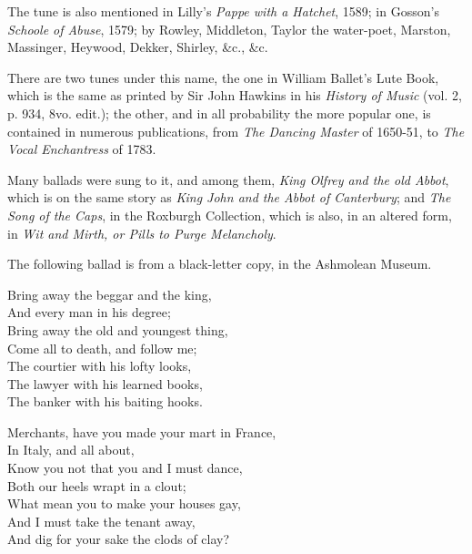 The tune is also mentioned in Lilly’s \textit{Pappe with a Hatchet}, 1589; in Gosson’s
\textit{Schoole of Abuse}, 1579; by Rowley, Middleton, Taylor the water-poet, Marston,
Massinger, Heywood, Dekker, Shirley, \&c., \&c.

There are two tunes under this name, the one in William Ballet’s Lute Book,
which is the same as printed by Sir John Hawkins in his \textit{History of Music}
(vol. 2, p. 934, 8vo. edit.); the other, and in all probability the more popular one,
is contained in numerous publications, from \textit{The Dancing Master} of 1650-51, to
\textit{The Vocal Enchantress} of 1783.
\normalsize

\pagebreak
Many ballads were sung to it, and among them, \textit{King Olfrey and the old Abbot},
which is on the same story as \textit{King John and the Abbot of Canterbury}; and \textit{The
Song of the Caps}, in the Roxburgh Collection, which is also, in an altered form,
in \textit{Wit and Mirth, or Pills to Purge Melancholy}.

The following ballad is from a black-letter copy, in the Ashmolean Museum.



\smallskip



\settowidth{\versewidth}{Merchants, have you made your mart in France,}
\begin{dcverse}\begin{patverse}
Bring away the beggar and the king,\\
And every man in his degree;\\
Bring away the old and youngest thing,\\
Come all to death, and follow me;\\
The courtier with his lofty looks,\\
The lawyer with his learned books,\\
The banker with his baiting hooks.
\end{patverse}

\begin{patverse}
Merchants, have you made your mart in France,\\
In Italy, and all about,\\
Know you not that you and I must dance,\\
Both our heels wrapt in a clout;\\
What mean you to make your houses gay,\\
And I must take the tenant away,\\
And dig for your sake the clods of clay?
\end{patverse}
\end{dcverse}

